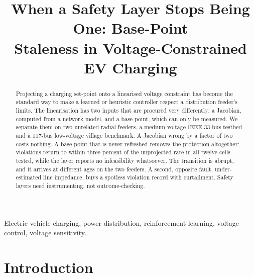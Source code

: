 \documentclass[conference,a4paper]{IEEEtran}
\begin{document}
\title{When a Safety Layer Stops Being One: Base-Point\\ Staleness in
Voltage-Constrained EV Charging
}

\author{
}

\maketitle

\begin{abstract}
Projecting a charging set-point onto a linearised voltage constraint has become
the standard way to make a learned or heuristic controller respect a
distribution feeder's limits. The linearisation has two inputs that are procured
very differently: a Jacobian, computed from a network model, and a base point,
which can only be measured. We separate them on two unrelated radial feeders, a
medium-voltage IEEE 33-bus testbed and a 117-bus low-voltage village benchmark.
A Jacobian wrong by a factor of two costs nothing. A base point that is never
refreshed removes the protection altogether: violations return to within three
percent of the unprojected rate in all twelve cells tested, while the layer
reports no infeasibility whatsoever. The transition is abrupt, and it arrives at
different ages on the two feeders. A second, opposite fault, under-estimated line
impedance, buys a spotless violation record with curtailment. Safety layers need
instrumenting, not outcome-checking.
\end{abstract}

\begin{IEEEkeywords}
Electric vehicle charging, power distribution, reinforcement learning, voltage
control, voltage sensitivity.
\end{IEEEkeywords}

\section{Introduction}
\end{document}
